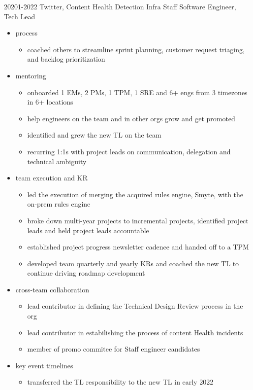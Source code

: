\documentclass[]{friggeri-cv-a4}
\begin{document}
\begin{entrylist}
  \entry
      {20201-2022}
      {Twitter, Content Health Detection Infra}
      {Staff Software Engineer, Tech Lead}
      {
        \begin{itemize}
        \item process
          \begin{itemize}
          \item coached others to streamline sprint planning, customer request triaging, and backlog prioritization
          \end{itemize}
        \item mentoring
          \begin{itemize}
          \item onboarded 1 EMs, 2 PMs, 1 TPM, 1 SRE and 6+ engs from 3 timezones in 6+ locations
          \item help engineers on the team and in other orgs grow and get promoted
          \item identified and grew the new TL on the team
          \item recurring 1:1s with project leads on communication, delegation and technical ambiguity
          \end{itemize}
        \item team execution and KR
          \begin{itemize}
          \item led the execution of merging the acquired rules engine, Smyte, with the on-prem rules engine
          \item broke down multi-year projects to incremental projects, identified project leads and held project leads accountable
          \item established project progress newsletter cadence and handed off to a TPM
          \item developed team quarterly and yearly KRs and coached the new TL to continue driving roadmap development
          \end{itemize}
        \item cross-team collaboration
          \begin{itemize}
          \item lead contributor in defining the Technical Design Review process in the org
          \item lead contributor in estabilishing the process of content Health incidents
          \item member of promo commitee for Staff engineer candidates
          \end{itemize}
        \item key event timelines
          \begin{itemize}
          \item transferred the TL responsibility to the new TL in early 2022
          \end{itemize}
        \end{itemize}
      }
\end{entrylist}
\end{document}
